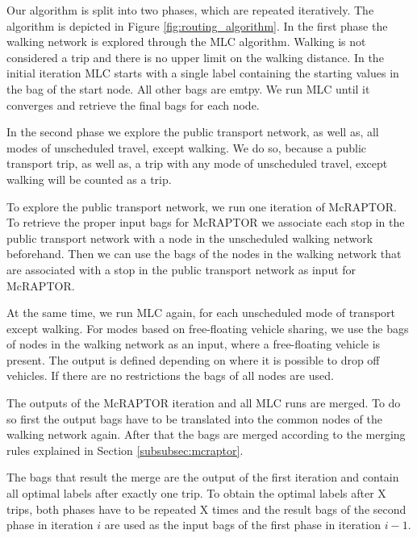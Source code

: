 Our algorithm is split into two phases, which are repeated iteratively.
The algorithm is depicted in Figure \ref{fig:routing_algorithm}.
In the first phase the walking network is explored through the MLC algorithm.
Walking is not considered a trip and there is no upper limit on the walking distance.
In the initial iteration MLC starts with a single label containing the starting values in the bag of the start node.
All other bags are emtpy.
We run MLC until it converges and retrieve the final bags for each node.

In the second phase we explore the public transport network, as well as, all modes of unscheduled travel, except walking.
We do so, because a public transport trip, as well as, a trip with any mode of unscheduled travel, except walking will be counted as a trip.

To explore the public transport network, we run one iteration of McRAPTOR.
To retrieve the proper input bags for McRAPTOR we associate each stop in the public transport network with a node in the unscheduled walking network beforehand.
Then we can use the bags of the nodes in the walking network that are associated with a stop in the public transport network as input for McRAPTOR.

At the same time, we run MLC again, for each unscheduled mode of transport except walking.
For modes based on free-floating vehicle sharing, we use the bags of nodes in the walking network as an input, where a free-floating vehicle is present.
The output is defined depending on where it is possible to drop off vehicles.
If there are no restrictions the bags of all nodes are used.

The outputs of the McRAPTOR iteration and all MLC runs are merged.
To do so first the output bags have to be translated into the common nodes of the walking network again.
After that the bags are merged according to the merging rules explained in Section \ref{subsubsec:mcraptor}.

The bags that result the merge are the output of the first iteration and contain all optimal labels after exactly one trip.
To obtain the optimal labels after X trips, both phases have to be repeated X times and the result bags of the second phase in iteration \(i\) are used as the input bags of the first phase in iteration \(i-1\).


